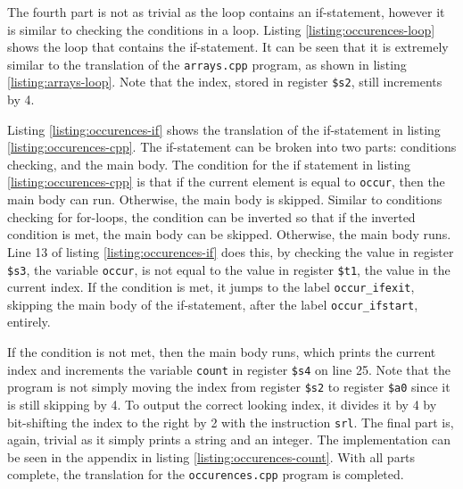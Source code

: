 \documentclass[11pt]{report}
\begin{document}

The fourth part is not as trivial as the loop contains an if-statement, however it is similar to
checking the conditions in a loop. Listing \ref{listing:occurences-loop} shows the loop that contains the if-statement.
It can be seen that it is extremely similar to the translation of the \verb|arrays.cpp| program, as
shown in listing \ref{listing:arrays-loop}. Note that the index, stored in register \verb|$s2|,
still increments by 4.

\newpage


Listing \ref{listing:occurences-if} shows the translation of the if-statement in listing
\ref{listing:occurences-cpp}. The if-statement can be broken into two parts: conditions checking,
and the main body. The condition for the if statement in listing \ref{listing:occurences-cpp} is
that if the current element is equal to \verb|occur|, then the main body can run. Otherwise, the
main body is skipped. Similar to conditions checking for for-loops, the condition can be inverted so
that if the inverted condition is met, the main body can be skipped. Otherwise, the main body runs.
Line 13 of listing \ref{listing:occurences-if} does this, by checking the value in register \verb|$s3|, the
variable \verb|occur|, is not equal to the value in register \verb|$t1|, the value in the current
index. If the condition is met, it jumps to the label \verb|occur_ifexit|, skipping the main body of
the if-statement, after the label \verb|occur_ifstart|, entirely.

If the condition is not met, then the main body runs, which prints the current index and increments
the variable \verb|count| in register \verb|$s4| on line 25. Note that the program is not simply
moving the index from register \verb|$s2| to register \verb|$a0| since it is still skipping by 4. To
output the correct looking index, it divides it by 4 by bit-shifting the index to the right by 2
with the instruction \verb|srl|. The final part is, again, trivial as it simply prints a string and
an integer. The implementation can be seen in the appendix in listing
\ref{listing:occurences-count}. With all parts complete, the translation for the
\verb|occurences.cpp| program is completed.
\end{document}
